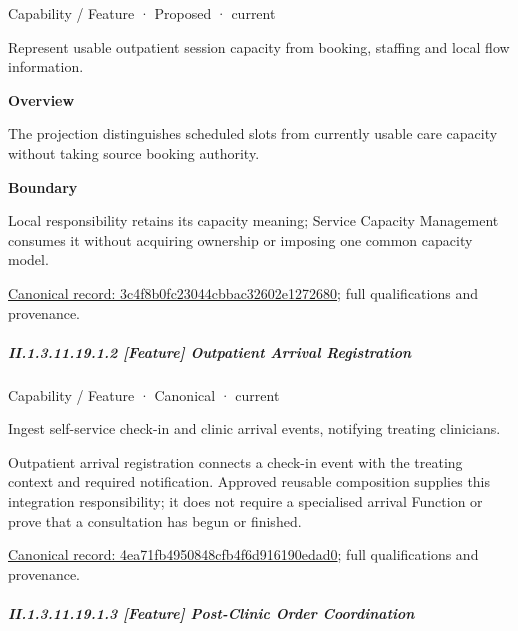 \label{element:3c4f8b0fc23044cbbac32602e1272680}
{\small Capability / Feature · Proposed · current}\par

Represent usable outpatient session capacity from booking, staffing and local flow information.



\textbf{Overview}



The projection distinguishes scheduled slots from currently usable care capacity without taking source booking authority.



\textbf{Boundary}



Local responsibility retains its capacity meaning; Service Capacity Management consumes it without acquiring ownership or imposing one common capacity model.


{\footnotesize \href{../../../../continuum/strategy/capability/feature/3c4f8b0fc23044cbbac32602e1272680.md}{Canonical record: 3c4f8b0fc23044cbbac32602e1272680}; full qualifications and provenance.}\par
\subparagraph*{II.1.3.11.19.1.2 [Feature] Outpatient Arrival Registration}
\label{navigation:II.1.3.11.19.1.2}

\label{element:4ea71fb4950848cfb4f6d916190edad0}
{\small Capability / Feature · Canonical · current}\par

Ingest self-service check-in and clinic arrival events, notifying treating clinicians.



Outpatient arrival registration connects a check-in event with the treating context and required notification. Approved reusable composition supplies this integration responsibility; it does not require a specialised arrival Function or prove that a consultation has begun or finished.


{\footnotesize \href{../../../../continuum/strategy/capability/feature/4ea71fb4950848cfb4f6d916190edad0.md}{Canonical record: 4ea71fb4950848cfb4f6d916190edad0}; full qualifications and provenance.}\par
\subparagraph*{II.1.3.11.19.1.3 [Feature] Post-Clinic Order Coordination}
\label{navigation:II.1.3.11.19.1.3}


